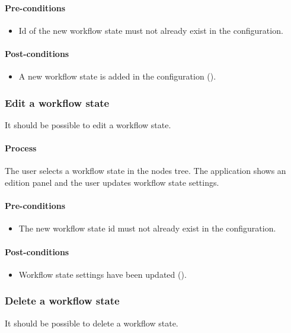\documentclass[11pt,a4paper,oneside]{article}
\begin{document}
\paragraph{Pre-conditions}
\begin{itemize}
	\item Id of the new workflow state must not already exist in the configuration.
\end{itemize}

\paragraph{Post-conditions}
\begin{itemize}
	\item A new workflow state is added in the configuration ().
\end{itemize}

\subsubsection{Edit a workflow state}
It should be possible to edit a workflow state.

\paragraph{Process}
The user selects a workflow state in the nodes tree. The application shows an edition panel and the user updates workflow state settings.

\paragraph{Pre-conditions}
\begin{itemize}
	\item The new workflow state id must not already exist in the configuration.
\end{itemize}

\paragraph{Post-conditions}
\begin{itemize}
	\item Workflow state settings have been updated ().
\end{itemize}

\subsubsection{Delete a workflow state}
It should be possible to delete a workflow state.
\end{document}
